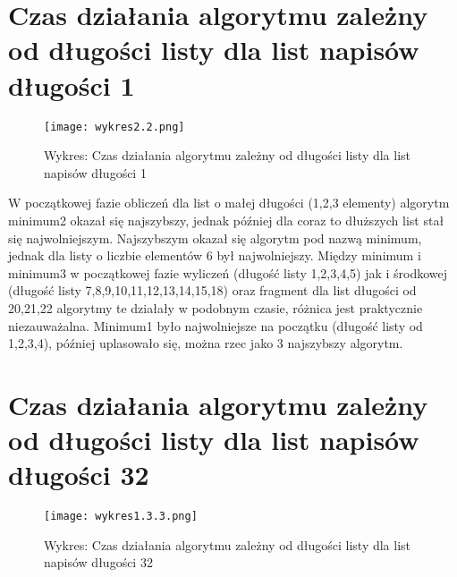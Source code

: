 \documentclass{mwart}
\begin{document}
	\section{\textbf{Czas działania algorytmu zależny od długości listy dla list napisów długości 1}}\label{Czas działania algorytmu zależny od długości listy dla list napisów długości 1}

	\medskip
	
	\begin{figure}[H]
		\begin{center}
			\texttt{[image: wykres2.2.png]}
			\caption{Wykres: Czas działania algorytmu zależny od długości listy dla list napisów długości 1}
		\end{center}
	\end{figure}

	\medskip

	\begin{pysub}
	
		W początkowej fazie obliczeń dla list o małej długości (1,2,3 elementy) algorytm minimum2 okazał się najszybszy, jednak później dla coraz to dłuższych list stał się najwolniejszym. Najszybszym okazał się algorytm pod nazwą minimum, jednak dla listy o liczbie elementów 6 był najwolniejszy. Między minimum i minimum3 w początkowej fazie wyliczeń (długość listy 1,2,3,4,5) jak i środkowej (długość listy 7,8,9,10,11,12,13,14,15,18) oraz fragment dla list długości od 20,21,22 algorytmy te działały w podobnym czasie, różnica jest praktycznie niezauważalna. Minimum1 było najwolniejsze na początku (długość listy od 1,2,3,4), później uplasowało się, można rzec jako 3 najszybszy algorytm. 
	\end{pysub}
	
	
	\section{\textbf{Czas działania algorytmu zależny od długości listy dla list napisów długości 32}}\label{Czas działania algorytmu zależny od długości listy dla list napisów długości 32}

	\medskip

	\begin{figure}[H]
		\begin{center}
			\texttt{[image: wykres1.3.3.png]}
			\caption{Wykres: Czas działania algorytmu zależny od długości listy dla list napisów długości 32}
		\end{center}
	\end{figure}
\end{document}
